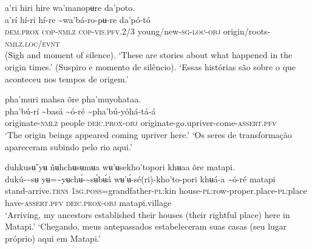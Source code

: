 \documentclass[output=paper,
modfonts,nonflat
]{langsci/langscibook}
\begin{document}
\ea a’ri hiri hire wa'manopʉre da'poto. \\[.3em]
\gll a’rí	hí-ri	hí-re	{\textasciitilde}wa'bá{\footnotemark}-ro-pʉ-re	da'pó-tó \\
     \textsc{dem.prox}	\textsc{cop-nmlz}	\textsc{cop-vis.pfv.}2/3	young/new\textsc{-sg-loc-obj}  	origin/roots-\textsc{nmlz.loc/evnt} \\
\glt (Sigh and moment of silence). ‘These are stories about what happened in the origin times.’
\glt (Suspiro e momento de silêncio). ‘Essas histórias são sobre o que aconteceu nos tempos de origem.’
\z 

\ea pha'muri mahsa õre pha'muyohataa.  \\[.3em]
\gll {\textasciitilde}pha'bú-rí	{\textasciitilde}basá 	{\textasciitilde}ó-ré	{\textasciitilde}pha'bú-yóhá-tá-á \\
     originate-\textsc{nmlz}	people  	\textsc{deic.prox-obj}  	originate-go.upriver-come-\textsc{assert.pfv} \\
\glt ‘The origin beings appeared coming upriver here.’
\glt ‘Os seres de transformação apareceram subindo pelo rio aqui.’
\z 

 
\ea duhkusʉ̃ yʉ ñʉhchʉsʉmʉa wʉ'ʉsekho'topori khʉaa õre matapi. \\[.3em]
\gll dukú-{\textasciitilde}sʉ{\footnotemark}	yʉ={\textasciitilde}yʉchʉ́-{\textasciitilde}sʉ́bʉ́á	wʉ'ʉ́-sé(ri)-kho'to-pori	khʉá-a {\textasciitilde}ó-ré	matapi \\
     stand-arrive.\textsc{trns}	1\textsc{sg.poss}=grandfather-\textsc{pl}:kin	house-\textsc{pl:}row-proper.place-\textsc{pl}:place	have-\textsc{assert.pfv} \textsc{deic.prox-obj}  	matapi.village \\
\glt ‘Arriving, my ancestors established their houses (their rightful place) here in Matapi.’
\glt ‘Chegando, meus antepassados estabeleceram suas casas (seu lugar próprio) aqui em Matapi.’
\z 
\end{document}
